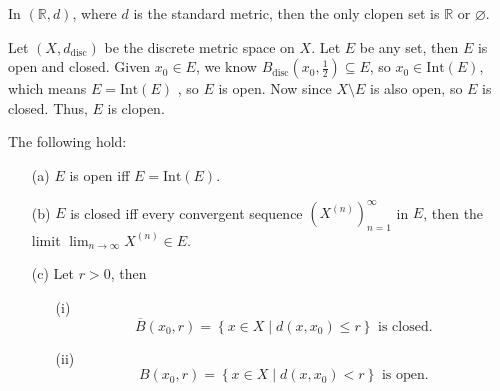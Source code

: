 \begin{remark}
    In \((\mathbb{R} , d)\), where \(d\) is the standard metric, then the only clopen set is \(\mathbb{R} \) or \(\varnothing \).    
\end{remark}

\begin{remark}
    Let \((X, d_{\mathrm{disc} })\) be the discrete metric space on \(X\). Let \(E\) be any set, then \(E\) is open and closed. Given \(x_0 \in E\), we know \(B_{\mathrm{disc} }\left( x_0, \frac{1}{2} \right) \subseteq E\), so \(x_0 \in \mathrm{Int}(E) \), which means \(E = \mathrm{Int}(E) \) , so \(E\) is open. Now since \(X \setminus E\) is also open, so \(E\) is closed. Thus, \(E\) is clopen.        
\end{remark}

\begin{proposition} \label{prop: many properties of open and closed set}
    The following hold: 
    \begin{itemize}
        \item [(a)] \(E\) is open iff \(E = \mathrm{Int}(E) \). 
        \item [(b)] \(E\) is closed iff every convergent sequence \(\left( X^{(n)} \right)_{n=1}^{\infty}  \) in \(E\), then the limit \(\lim_{n \to \infty} X^{(n)} \in E\). 
        \item [(c)] Let \(r > 0\), then 
        \begin{itemize}
            \item [(i)]         \[
            \overline{B}(x_0, r) = \left\{ x \in X \mid d(x, x_0) \le r \right\}  \text{ is closed.}
        \]
            \item [(ii)]        \[
            B(x_0, r) = \left\{ x \in X \mid d(x, x_0) < r \right\} \text{ is open.}
        \]
        \end{itemize}


\end{itemize}
\end{proposition}
